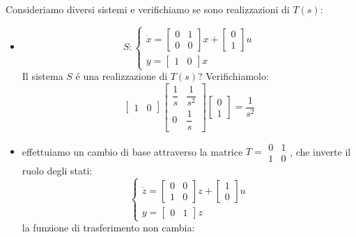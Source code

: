 \documentclass[../main.tex]{subfiles}
\begin{document}
		Consideriamo diversi sistemi e verifichiamo se sono realizzazioni di $ T(s) $:
		\begin{itemize}
			\item 
				\[
					S:
					\begin{cases}
						\dot x =
						\begin{bmatrix}
							0 & 1\\
							0 & 0
						\end{bmatrix} x+
						\begin{bmatrix}
							0\\
							1
						\end{bmatrix} u
						\\
						y =
						\begin{bmatrix}
							1 & 0
						\end{bmatrix} x
					\end{cases}
				\]
				Il sistema $ S $ \'e una realizzazione di $ T(s) $? Verifichiamolo:
				\[
					\begin{bmatrix}
						1 & 0
					\end{bmatrix}
					\begin{bmatrix}
						\dfrac{1}{s} & \dfrac{1}{s^2}\\[.5cm]
						0 & \dfrac{1}{s}
					\end{bmatrix}
					\begin{bmatrix}
						0\\
						1
					\end{bmatrix} = \dfrac{1}{s^2}
				\]
			\item 
				effettuiamo un cambio di base attraverso la matrice $ T = \begin{smallmatrix} 0 & 1\\ 1 & 0 \end{smallmatrix} $, che inverte il ruolo degli stati:
				\[
					\begin{cases}
					\dot z =
					\begin{bmatrix}
						0 & 0\\
						1 & 0
					\end{bmatrix} z+
					\begin{bmatrix}
						1\\
						0
					\end{bmatrix} u
					\\
					y =
					\begin{bmatrix}
						0 & 1
					\end{bmatrix} z
					\end{cases}
				\]
				la funzione di trasferimento non cambia:

\end{itemize}
\end{document}
